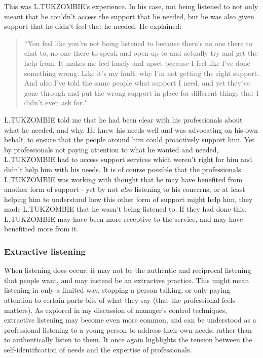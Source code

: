 This was L.TUKZOMBIE’s experience. In his case, not being listened to not only meant that he couldn’t access the support that he needed, but he was also given support that he didn’t feel that he needed. He explained: 
\begin{quote}
“You feel like you're not being listened to because there's no one there to chat to, no one there to speak and open up to and actually try and get the help from. It makes me feel lonely and upset because I feel like I've done something wrong. Like it's my fault, why I'm not getting the right support. And also I've told the same people what support I need, and yet they've gone through and put the wrong support in place for different things that I didn't even ask for."
\end{quote}
L.TUKZOMBIE told me that he had been clear with his professionals about what he needed, and why. He knew his needs well and was advocating on his own behalf, to ensure that the people around him could proactively support him. Yet by professionals not paying attention to what he wanted and needed, L.TUKZOMBIE had to access support services which weren't right for him and didn't help him with his needs. It is of course possible that the professionals L.TUKZOMBIE was working with thought that he may have benefited from another form of support - yet by not \emph{also} listening to his concerns, or at least helping him to understand how this other form of support might help him, they made L.TUKZOMBIE that he wasn't being listened to. If they had done this, L.TUKZOMBIE may have been more receptive to the service, and may have benefitted more from it.

\subsubsection{Extractive listening}
When listening does occur, it may not be the authentic and reciprocal listening that people want, and may instead be an extractive practice. This might mean listening in only a limited way, stopping a person talking, or only paying attention to certain parts bits of what they say (that the professional feels matters). As explored in my discussion of manager's control techniques, extractive listening may become even more common, and can be understood as a professional listening to a young person to address their own needs, rather than to authentically listen to them. It once again highlights the tension between the self-identification of needs and the expertise of professionals. 

